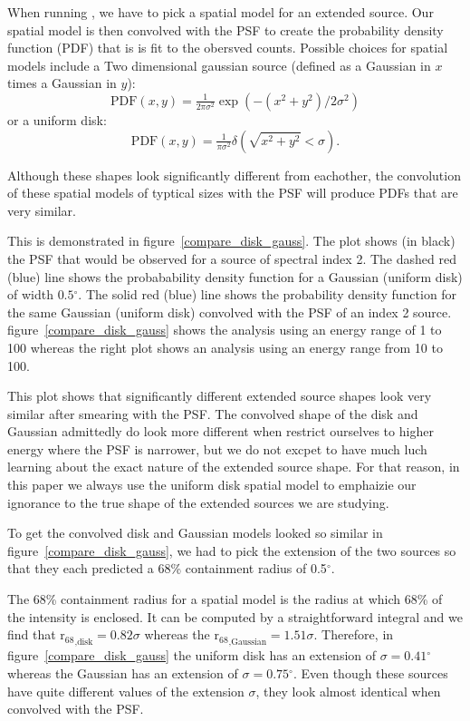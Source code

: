 \documentclass[preprint]{aastex}
\newcommand{\gev}{\text{GeV}\xspace}
\newcommand{\rsixeight}{{\ensuremath{\text{r}_{68}}}\xspace}
\renewcommand{\deg}{\ensuremath{^\circ}\xspace}
\newcommand{\pointlike}{\text{\em pointlike}\xspace}
\begin{document}

When running \pointlike, we have to pick a spatial model for an extended
source. Our spatial model is then convolved with the PSF to create the
probability density function (PDF) that is is fit to the obersved counts.
Possible choices for spatial models include a Two dimensional gaussian
source (defined as a Gaussian in $x$ times a Gaussian in $y$):
\begin{equation}
  \text{PDF}(x,y)=\tfrac{1}{2\pi\sigma^2}\exp\left(-(x^2+y^2)/2\sigma^2\right)
\end{equation}
or a uniform disk:
\begin{equation}
  \text{PDF}(x,y)=\tfrac{1}{\pi\sigma^2}\delta\left(\sqrt{x^2+y^2}<\sigma\right).
\end{equation}

Although these shapes look significantly different from eachother, the
convolution of these spatial models of typtical sizes 
with the PSF will produce PDFs that are very similar.

This is demonstrated in figure~\ref{compare_disk_gauss}.  The plot shows
(in black) the PSF that would be observed for a source of spectral index
2. The dashed red (blue) line shows the probabability density function
for a Gaussian (uniform disk) of width $0.5\deg$.  The solid red (blue)
line shows the probability density function for the same Gaussian (uniform
disk) convolved with the PSF of an index 2 source.  
figure~\ref{compare_disk_gauss} shows the analysis using an energy range
of 1\gev to 100\gev whereas the right plot shows an analysis using an
energy range from 10\gev to 100\gev.

This plot shows that significantly different extended source shapes
look very similar after smearing with the PSF. The convolved shape of
the disk and Gaussian admittedly do look more different when restrict
ourselves to higher energy where the PSF is narrower, but we do not
excpet to have much luch learning about the exact nature of the
extended source shape. For that reason, in this paper we always use
the uniform disk spatial model to emphaizie our ignorance to the true
shape of the extended sources we are studying.

To get the convolved disk and Gaussian models looked so similar in
figure~\ref{compare_disk_gauss}, we had to pick the extension of the two
sources so that they each predicted a 68\% containment radius of 0.5\deg.

The 68\% containment radius for a spatial model is
the radius at which 68\% of the intensity is enclosed.
It can be computed by a straightforward integral and we
find that $\rsixeight_\text{,disk}=0.82\sigma$ whereas
the $\rsixeight_\text{,Gaussian}=1.51\sigma$. Therefore, in
figure~\ref{compare_disk_gauss} the uniform disk has an extension
of $\sigma=0.41\deg$ whereas the Gaussian has an extension of
$\sigma=0.75\deg$. Even though these sources have quite different
values of the extension $\sigma$, they look almost identical when convolved
with the PSF.
\end{document}
